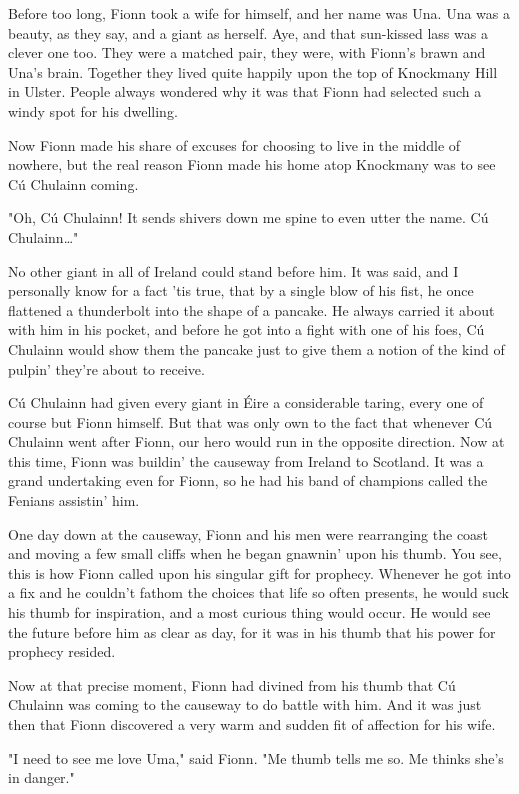 Before too long, Fionn took a wife for himself, and her name was Una. Una was a beauty, as they say, and a giant as herself. Aye, and that sun-kissed lass was a clever one too. They were a matched pair, they were, with Fionn's brawn and Una's brain. Together they lived quite happily upon the top of Knockmany Hill in Ulster. People always wondered why it was that Fionn had selected such a windy spot for his dwelling.

Now Fionn made his share of excuses for choosing to live in the middle of nowhere, but the real reason Fionn made his home atop Knockmany was to see Cú Chulainn coming.

"Oh, Cú Chulainn! It sends shivers down me spine to even utter the name. Cú Chulainn\dots"

No other giant in all of Ireland could stand before him. It was said, and I personally know for a fact 'tis true, that by a single blow of his fist, he once flattened a thunderbolt into the shape of a pancake. He always carried it about with him in his pocket, and before he got into a fight with one of his foes, Cú Chulainn would show them the pancake just to give them a notion of the kind of pulpin' they're about to receive.

Cú Chulainn had given every giant in Éire a considerable taring, every one of course but Fionn himself. But that was only own to the fact that whenever Cú Chulainn went after Fionn, our hero would run in the opposite direction. Now at this time, Fionn was buildin' the causeway from Ireland to Scotland. It was a grand undertaking even for Fionn, so he had his band of champions called the Fenians assistin' him.

One day down at the causeway, Fionn and his men were rearranging the coast and moving a few small cliffs when he began gnawnin' upon his thumb. You see, this is how Fionn called upon his singular gift for prophecy. Whenever he got into a fix and he couldn't fathom the choices that life so often presents, he would suck his thumb for inspiration, and a most curious thing would occur. He would see the future before him as clear as day, for it was in his thumb that his power for prophecy resided.

Now at that precise moment, Fionn had divined from his thumb that Cú Chulainn was coming to the causeway to do battle with him. And it was just then that Fionn discovered a very warm and sudden fit of affection for his wife.

"I need to see me love Uma," said Fionn. "Me thumb tells me so. Me thinks she's in danger."

